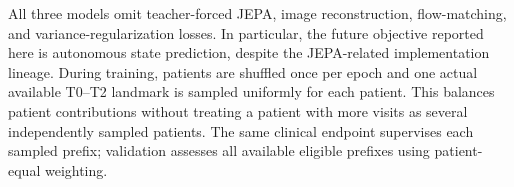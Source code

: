 All three models omit teacher-forced JEPA, image reconstruction, flow-matching, and variance-regularization losses. In particular, the future objective reported here is autonomous state prediction, despite the JEPA-related implementation lineage. During training, patients are shuffled once per epoch and one actual available T0--T2 landmark is sampled uniformly for each patient. This balances patient contributions without treating a patient with more visits as several independently sampled patients. The same clinical endpoint supervises each sampled prefix; validation assesses all available eligible prefixes using patient-equal weighting.
